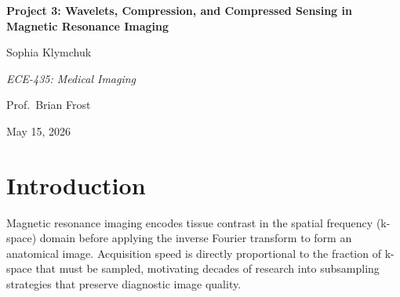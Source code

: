 \documentclass[10pt]{article}
\begin{document}
  \begin{center}
    {\LARGE \textbf{Project 3: Wavelets, Compression, and Compressed Sensing in Magnetic Resonance Imaging} \par}
    \vspace{0.4cm}
    {\Large Sophia Klymchuk \par}
    \vspace{0.2cm}
    {\large \textit{ECE-435: Medical Imaging} \par}
    {\large Prof.\ Brian Frost \par}
    \vspace{0.4cm}
    {\large May 15, 2026 \par}
    \vspace{0.8cm}
  \end{center}


\begin{abstract}
This report investigates sparsity-based compression and compressed sensing
(CS) of structural MRI data from OpenNeuro dataset ds001499.
We first characterize the Fourier and wavelet-domain sparsity of T1- and
T2-weighted brain volumes and find that, despite the sparse Fourier
magnitude distribution, Fourier-domain compression is fundamentally limited
by non-redundant phase information.  Wavelet-domain compression, by contrast,
exploits the true sparsity of piecewise-smooth anatomical images: the
Coiflet~3 basis at decomposition level~2 supports discarding 99\% of
coefficients while keeping normalized root-mean-square error (NRMSE) below
10\% of the image dynamic range, a result that generalizes across slices and
imaging contrasts.  Finally, an ISTA-based CS reconstruction algorithm that
enforces wavelet sparsity successfully recovers diagnostic-quality images
from as little as 50\% k-space sampling (NRMSE $\approx 3.8\%$), with
performance degrading as the sampling fraction decreases.
\end{abstract}


\section{Introduction}
\label{sec:intro}

Magnetic resonance imaging encodes tissue contrast in the spatial frequency
(k-space) domain before applying the inverse Fourier transform to form an
anatomical image.  Acquisition speed is directly proportional to the fraction
of k-space that must be sampled, motivating decades of research into
subsampling strategies that preserve diagnostic image quality.
\end{document}
